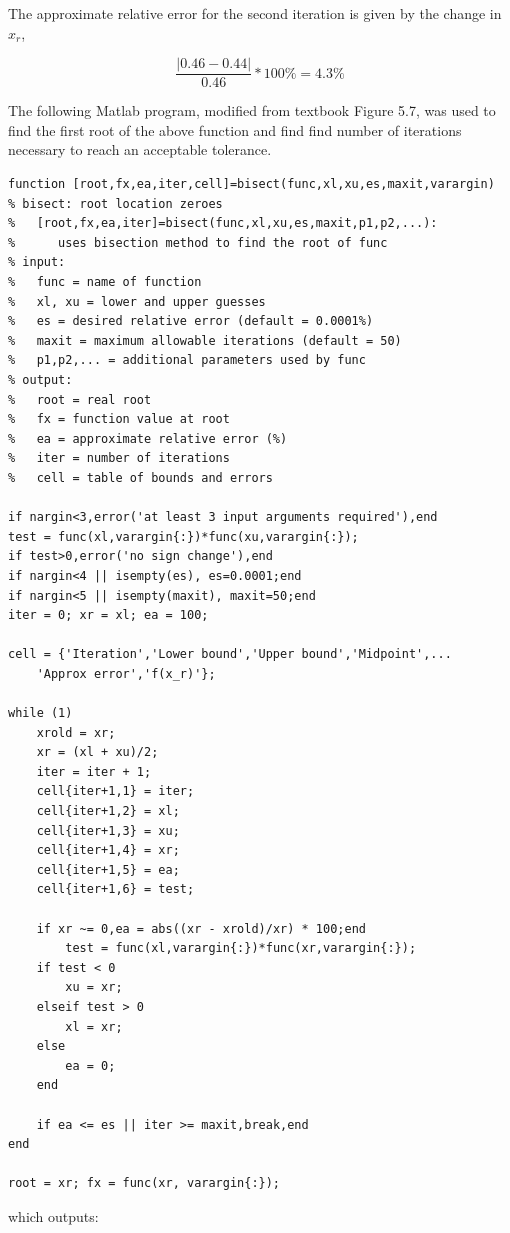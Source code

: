 \documentclass{article}
\begin{document}
The approximate relative error for the second iteration is given by the change in $x_r$,

$$ \frac{| 0.46 - 0.44 | }{0.46} * 100\% = 4.3\% $$


The following Matlab program, modified from textbook Figure 5.7, was used to find the first root of the above function and find find number of iterations necessary to reach an acceptable tolerance.
\begin{lstlisting}
function [root,fx,ea,iter,cell]=bisect(func,xl,xu,es,maxit,varargin)
% bisect: root location zeroes
%   [root,fx,ea,iter]=bisect(func,xl,xu,es,maxit,p1,p2,...):
%      uses bisection method to find the root of func
% input:
%   func = name of function
%   xl, xu = lower and upper guesses
%   es = desired relative error (default = 0.0001%)
%   maxit = maximum allowable iterations (default = 50)
%   p1,p2,... = additional parameters used by func
% output:
%   root = real root
%   fx = function value at root
%   ea = approximate relative error (%)
%   iter = number of iterations
%   cell = table of bounds and errors

if nargin<3,error('at least 3 input arguments required'),end
test = func(xl,varargin{:})*func(xu,varargin{:});
if test>0,error('no sign change'),end
if nargin<4 || isempty(es), es=0.0001;end
if nargin<5 || isempty(maxit), maxit=50;end
iter = 0; xr = xl; ea = 100;

cell = {'Iteration','Lower bound','Upper bound','Midpoint',...
    'Approx error','f(x_r)'};

while (1)
    xrold = xr;
    xr = (xl + xu)/2;
    iter = iter + 1;
    cell{iter+1,1} = iter;
    cell{iter+1,2} = xl;
    cell{iter+1,3} = xu;
    cell{iter+1,4} = xr;
    cell{iter+1,5} = ea;
    cell{iter+1,6} = test;
    
    if xr ~= 0,ea = abs((xr - xrold)/xr) * 100;end
        test = func(xl,varargin{:})*func(xr,varargin{:});
    if test < 0
        xu = xr;
    elseif test > 0
        xl = xr;
    else
        ea = 0;
    end
    
    if ea <= es || iter >= maxit,break,end
end

root = xr; fx = func(xr, varargin{:});
\end{lstlisting}

\hspace{20pt}

\noindent which outputs:
\end{document}
